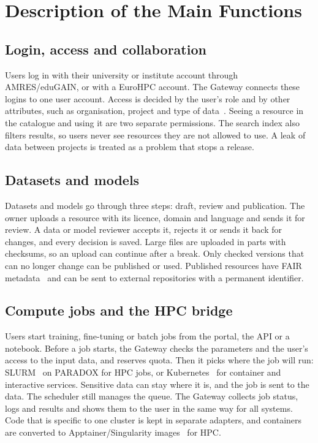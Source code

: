 \documentclass[conference,a4paper]{IEEEtran}
\begin{document}
\section{Description of the Main Functions}

\subsection{Login, access and collaboration}
Users log in with their university or institute account through AMRES/eduGAIN, or with a EuroHPC account. The Gateway connects these logins to one user account. Access is decided by the user's role and by other attributes, such as organisation, project and type of data~\cite{nist_abac}. Seeing a resource in the catalogue and using it are two separate permissions. The search index also filters results, so users never see resources they are not allowed to use. A leak of data between projects is treated as a problem that stops a release.

\subsection{Datasets and models}
Datasets and models go through three steps: draft, review and publication. The owner uploads a resource with its licence, domain and language and sends it for review. A data or model reviewer accepts it, rejects it or sends it back for changes, and every decision is saved. Large files are uploaded in parts with checksums, so an upload can continue after a break. Only checked versions that can no longer change can be published or used. Published resources have FAIR metadata~\cite{wilkinson2016fair} and can be sent to external repositories with a permanent identifier.

\subsection{Compute jobs and the HPC bridge}
Users start training, fine-tuning or batch jobs from the portal, the API or a notebook. Before a job starts, the Gateway checks the parameters and the user's access to the input data, and reserves quota. Then it picks where the job will run: SLURM~\cite{yoo2003slurm} on PARADOX for HPC jobs, or Kubernetes~\cite{burns2016borg} for container and interactive services. Sensitive data can stay where it is, and the job is sent to the data. The scheduler still manages the queue. The Gateway collects job status, logs and results and shows them to the user in the same way for all systems. Code that is specific to one cluster is kept in separate adapters, and containers are converted to Apptainer/Singularity images~\cite{kurtzer2017singularity} for HPC.
\end{document}
